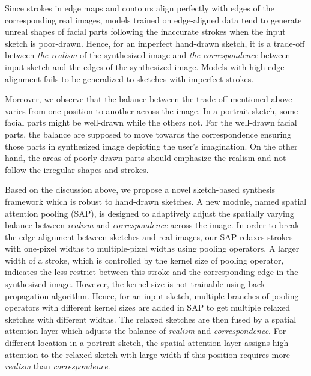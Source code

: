 Since strokes in edge maps and contours align perfectly with edges of the corresponding real images, models trained on edge-aligned data tend to generate unreal shapes of facial parts following the inaccurate strokes when the input sketch is poor-drawn. Hence, for an imperfect hand-drawn sketch, it is a trade-off between \textit{the realism} of the synthesized image and \textit{the correspondence} between input sketch and the edges of the synthesized image.
Models with high edge-alignment fails to be generalized to sketches with imperfect strokes.

Moreover, we observe that the balance between the trade-off mentioned above varies from one position to another across the image. In a portrait sketch, some facial parts might be well-drawn while the others not. For the well-drawn facial parts, the balance are supposed to move towards the correspondence ensuring those parts in synthesized image depicting the user's imagination. On the other hand, the areas of poorly-drawn parts should emphasize the realism and not follow the irregular shapes and strokes.

Based on the discussion above, we propose a novel sketch-based synthesis framework which is robust to hand-drawn sketches. A new module, named spatial attention pooling (SAP), is designed to adaptively adjust the spatially varying balance between \textit{realism} and \textit{correspondence}  across the image. In order to break the edge-alignment between sketches and real images, our SAP relaxes strokes with one-pixel widths to multiple-pixel widths using pooling operators. A larger width of a stroke, which is controlled by the kernel size of pooling operator, indicates the less restrict between this stroke and the corresponding edge in the synthesized image. However, the kernel size is not trainable using back propagation algorithm. Hence, for an input sketch, multiple branches of pooling operators with different kernel sizes are added in SAP to get multiple relaxed sketches with different widths. The relaxed sketches are then fused by a spatial attention layer which adjusts the balance of \textit{realism} and \textit{correspondence}. For different location in a portrait sketch, the spatial attention layer assigns high attention to the relaxed sketch with large width if this position requires more \textit{realism} than \textit{correspondence}. 

